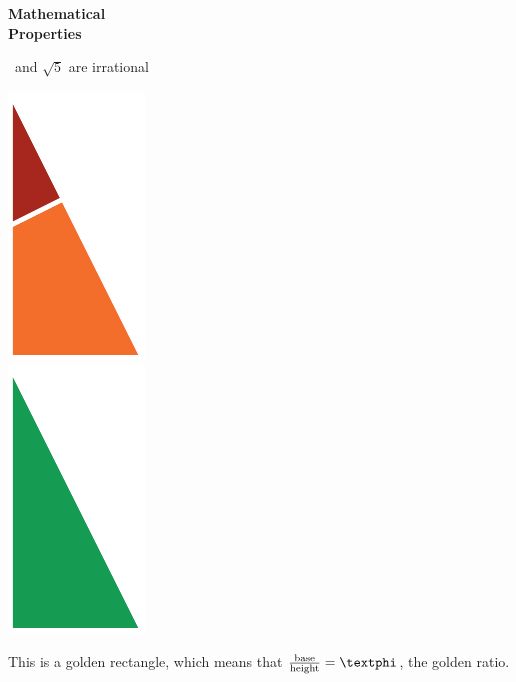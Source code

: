 \documentclass[14pt]{beamer}
\begin{document}

    \begin{frame}{}
        \begin{center}
            \textbf{\Huge Mathematical\\\bigskip Properties}\\
        \end{center}
    \end{frame}


    \begin{frame}{\textphi\ and $\sqrt{5}$ are irrational}
        \begin{center}
            \begin{minipage}{0.45\textwidth}%
                \includegraphics[scale=0.750]{figures/figure020a.pdf} \\[2ex]
                \includegraphics[scale=0.750]{figures/figure020b.pdf} \\
            \end{minipage}\hfill\begin{minipage}{0.5\textwidth}
                \footnotesize
                This is a golden rectangle, which means that $\tfrac{\text{base}}{\text{height}} = \text{\textphi}$, the golden ratio.\bigskip


\end{minipage}
\end{center}
\end{frame}
\end{document}
